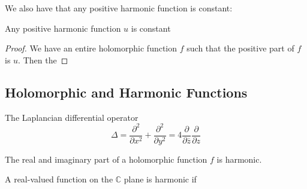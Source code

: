 \documentclass[main.tex]{subfiles}
\begin{document}
We also have that any positive harmonic function is constant:

\begin{corollary}
Any positive harmonic function $u$ is constant
\end{corollary}

\begin{proof}
We have an entire holomorphic function $f$ such that the positive part of $f$ is $u$. Then the 
\end{proof}
\subsection{Holomorphic and Harmonic Functions}

The Laplancian differential operator 
$$
\Delta = \frac{\partial^2}{\partial x^2} + \frac{\partial^2}{\partial y^2} = 4 \frac{\partial}{\partial \overline{z}} \frac{\partial}{\partial {z}}
$$

The real and imaginary part of a holomorphic function $f$ is harmonic.

A real-valued function on the $\mathbb{C}$ plane is harmonic if 
\end{document}
